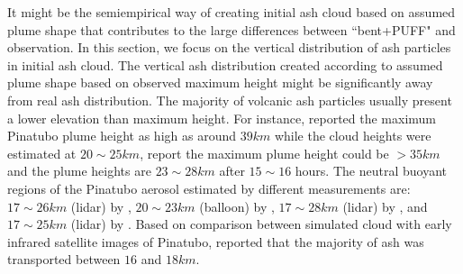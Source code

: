 It might be the semiempirical way of creating initial ash cloud based on assumed plume shape that contributes to the large differences between ``bent+PUFF" and observation. In this section, we focus on the vertical distribution of ash particles in initial ash cloud. The vertical ash distribution created according to assumed plume shape based on observed maximum height might be significantly away from real ash distribution.
The majority of volcanic ash particles usually present a lower elevation than maximum height. For instance, \citet{holasek1996satellite, holasek1996experiments} reported the maximum Pinatubo plume height as high as around $39 km$ while the cloud heights were estimated at $20 \sim 25 km $, \citet{self1993atmospheric} report the maximum plume height could be $>35 km$ and the plume heights are $23 \sim 28 km$ after $15 \sim 16$ hours. The neutral buoyant regions of the Pinatubo aerosol estimated by different measurements are: $17 \sim 26 km$ (lidar) by \citet{defoor1992early}, $20 \sim 23 km$ (balloon) by \citet{deshler1992balloonborne}, $17 \sim 28 km$ (lidar) by \citet{jager1992pinatubo}, and $17 \sim 25 km$ (lidar) by \citet{avdyushin19931}. Based on comparison between simulated cloud with early infrared satellite images of Pinatubo, \citet{fero2008simulation} reported that the majority of ash was transported between $16$ and $18 km$. 

